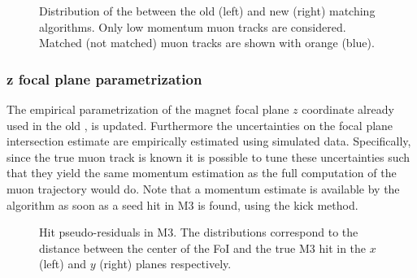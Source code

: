 \begin{figure}[t]
  \centering
  \begin{subfigure}{0.5\textwidth}
    \raggedright
    \scalebox{.55}{}
    \caption{}
    \label{mvTTm_chi2}
  \end{subfigure}%
  \hfill%
  \begin{subfigure}{0.5\textwidth}
    \raggedleft
    \scalebox{.55}{}
    \caption{}
    \label{mvm_chi2}
  \end{subfigure}
  \caption{Distribution of the \chisq between the old (left) and new (right) matching algorithms.
           Only low momentum muon tracks are considered. Matched (not matched) muon tracks are shown with orange (blue).}
 \label{mvm_chi2_comp}
\end{figure}

\subsubsection{z focal plane parametrization}
The empirical parametrization of the magnet focal plane $z$ coordinate already used in the old \mvm \cite{roelThesis},
is updated. Furthermore the uncertainties on the focal plane intersection estimate are empirically estimated using simulated data.
Specifically, since the true muon track is known it is possible to tune these uncertainties such that they yield the same momentum
estimation as the full computation of the muon trajectory would do. Note that a momentum estimate is available by the
\mvTTm algorithm as soon as a seed hit in M3 is found, using the kick method.

\begin{figure}[t]
  \centering
  \begin{subfigure}{0.5\textwidth}
    \raggedright
    \scalebox{.55}{}
    \caption{}
    \label{mvTTm_res_x}
  \end{subfigure}%
  \hfill%
  \begin{subfigure}{0.5\textwidth}
    \raggedleft
    \scalebox{.55}{}
    \caption{}
    \label{mvm_res_y}
  \end{subfigure}
  \caption{Hit pseudo-residuals in M3. The distributions correspond to the distance between the center of the FoI and the true M3 hit
           in the $x$ (left) and $y$ (right) planes respectively.}
 \label{mvm_res}
\end{figure}

